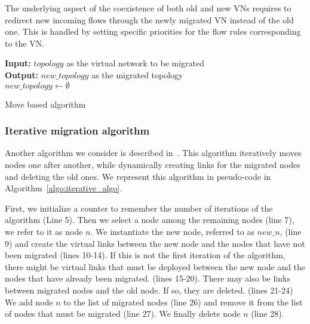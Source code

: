 The underlying aspect of the coexistence of both old and new VNs requires to redirect new incoming flows through the newly migrated VN instead of the old one.
This is handled by setting specific priorities for the flow rules corresponding to the VN.


\begin{algorithm}[ht]
\textbf{Input: }$topology$ as the virtual network to be migrated\\
\textbf{Output: } $new\_topology$ as the migrated topology\\
$new\_topology \gets \emptyset$\\
\caption{Move based algorithm}
\label{algo:move_algo}
\end{algorithm}


\subsubsection{Iterative migration algorithm}
Another algorithm we consider is described in~\cite{vnm-lo2013}.
This algorithm iteratively moves nodes one after another, while dynamically creating links for the migrated nodes and deleting the old ones.
We represent this algorithm in pseudo-code in Algorithm~\ref{algo:iterative_algo}.

First, we initialize a counter to remember the number of iterations of the algorithm (Line 5).
Then we select a node among the remaining nodes (line 7), we refer to it as node $n$. We instantiate the new node, referred to as $new\_n$, (line 9) and create the virtual links between the new node and the nodes that have not been migrated (lines 10-14).
If this is not the first iteration of the algorithm, there might be virtual links that must be deployed between the new node and the nodes that have already been migrated. (lines 15-20).
There may also be links between migrated nodes and the old node.
If so, they are deleted. (lines 21-24)
We add node $n$ to the list of migrated nodes (line 26) and remove it from the list of nodes that must be migrated (line 27). We finally delete node $n$ (line 28).




